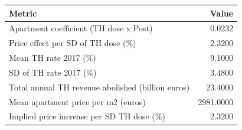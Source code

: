 
\begin{tabular}{lr}
\toprule
Metric & Value\\
\midrule
Apartment coefficient (TH dose x Post) & 0.0232\\
Price effect per SD of TH dose (\%) & 2.3200\\
Mean TH rate 2017 (\%) & 9.1000\\
SD of TH rate 2017 (\%) & 3.4800\\
Total annual TH revenue abolished (billion euros) & 23.4000\\
\addlinespace
Mean apartment price per m2 (euros) & 2981.0000\\
Implied price increase per SD TH dose (\%) & 2.3200\\
\bottomrule
\end{tabular}

